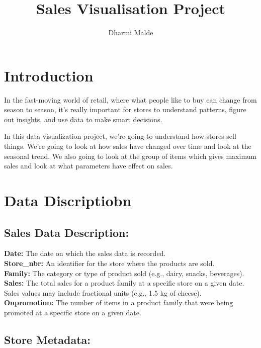 \documentclass[
]{article}
\title{Sales Visualisation Project}
\author{Dharmi Malde}
\date{}
\begin{document}
\maketitle

\hypertarget{introduction}{%
\section{Introduction}\label{introduction}}

In the fast-moving world of retail, where what people like to buy can
change from season to season, it's really important for stores to
understand patterns, figure out insights, and use data to make smart
decisions.

In this data visualization project, we're going to understand how stores
sell things. We're going to look at how sales have changed over time and
look at the seasonal trend. We also going to look at the group of items
which gives maximum sales and look at what parameters have effect on
sales.

\hypertarget{data-discriptiobn}{%
\section{Data Discriptiobn}\label{data-discriptiobn}}

\hypertarget{sales-data-description}{%
\subsection{Sales Data Description:}\label{sales-data-description}}

\textbf{Date:} The date on which the sales data is recorded.\\
\textbf{Store\_nbr:} An identifier for the store where the products are
sold.\\
\textbf{Family:} The category or type of product sold (e.g., dairy,
snacks, beverages).\\
\textbf{Sales:} The total sales for a product family at a specific store
on a given date. Sales values may include fractional units (e.g., 1.5 kg
of cheese).\\
\textbf{Onpromotion:} The number of items in a product family that were
being promoted at a specific store on a given date.

\hypertarget{store-metadata}{%
\subsection{Store Metadata:}\label{store-metadata}}
\end{document}
